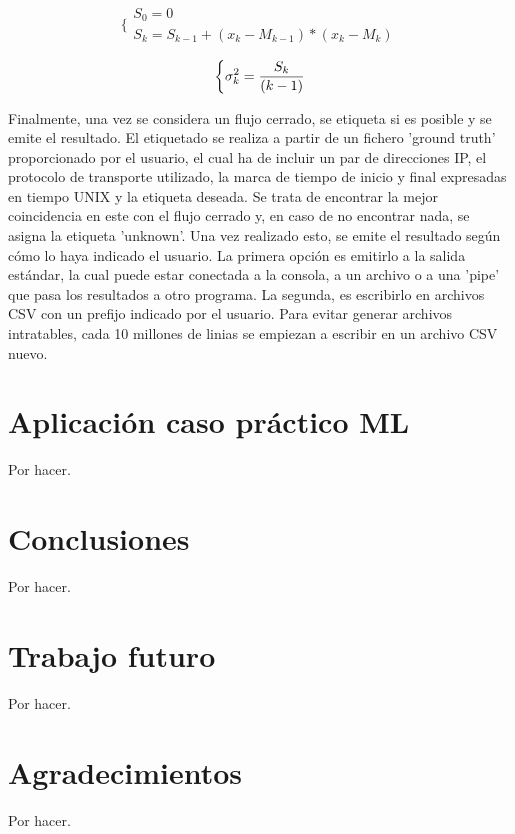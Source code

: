 \documentclass[10pt,a4paper,twoside]{article}
\begin{document}
\begin{multicols}{2}
    \begin{equation} \label{eq:sqrrec}
    \biggl\{
        \begin{array}{l}
            S_{0} = 0 \\
            S_{k} = S_{k-1} + ( x_{k} - M_{k-1} ) * ( x_{k} - M_{k} )
        \end{array}      
    \end{equation}
    
    \begin{equation} \label{eq:variancereq}
    \biggl\{
        \sigma^2_{k} = {S_{k} \over {(k - 1)}}
    \end{equation}

    Finalmente, una vez se considera un flujo cerrado, se etiqueta si es posible y se emite el resultado. El etiquetado se realiza a partir de un fichero 'ground truth' proporcionado por el usuario, el cual ha de incluir un par de direcciones IP, el protocolo de transporte utilizado, la marca de tiempo de inicio y final expresadas en tiempo UNIX y la etiqueta deseada. Se trata de encontrar la mejor coincidencia en este con el flujo cerrado y, en caso de no encontrar nada, se asigna la etiqueta 'unknown'. Una vez realizado esto, se emite el resultado según cómo lo haya indicado el usuario. La primera opción es emitirlo a la salida estándar, la cual puede estar conectada a la consola, a un archivo o a una 'pipe' que pasa los resultados a otro programa. La segunda, es escribirlo en archivos CSV con un prefijo indicado por el usuario. Para evitar generar archivos intratables, cada 10 millones de linias se empiezan a escribir en un archivo CSV nuevo.

    \section{Aplicación caso práctico ML} \label{casoml}

    Por hacer.

    \section{Conclusiones} \label{conclusiones}

    Por hacer.

    \section{Trabajo futuro} \label{tabajofuturo}

    Por hacer.

    \section{Agradecimientos} \label{agradecimientos}

    Por hacer.

    

\end{multicols}
\end{document}
